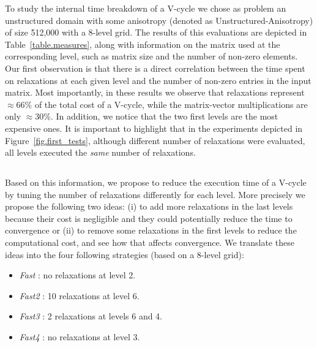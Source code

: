 To study the internal time breakdown of a V-cycle we chose as problem an
unstructured domain with some anisotropy (denoted as Unstructured-Anisotropy)
of size 512,000 with a 8-level grid. The results of this evaluations are
depicted in Table~\ref{table.measures}, along with information on the matrix
used at the corresponding level, such as matrix size and the number of non-zero
elements.  Our first observation is that there is a direct correlation between
the time spent on relaxations at each given level and the number of non-zero
entries in the input matrix. Most importantly, in these results we observe that
relaxations represent $\approx66\%$ of the total cost of a V-cycle, while the
matrix-vector multiplications are only $\approx30\%$. In addition, we notice
that the two first levels are the most expensive ones.  It is important to
highlight that in the experiments depicted in Figure~\ref{fig.first_tests},
although different number of relaxations were evaluated, all levels executed
the \emph{same} number of relaxations.

\subsection{}

Based on this information, we propose to reduce the execution time of a V-cycle
by tuning the number of relaxations differently for each level. More precisely
we propose the following two ideas: (i) to add more relaxations in the last
levels because their cost is negligible and they could potentially reduce the
time to convergence or (ii) to remove some relaxations in the first levels to
reduce the computational cost, and see how that affects convergence. We
translate these ideas into the four following strategies (based on a 8-level
grid):

\begin{itemize}
    \item \emph{Fast } : no relaxations at level 2.
    \item \emph{Fast2} : 10 relaxations at level 6.
    \item \emph{Fast3} :  2 relaxations at levels 6 and 4.
    \item \emph{Fast4} : no relaxations at level 3.
\end{itemize}

